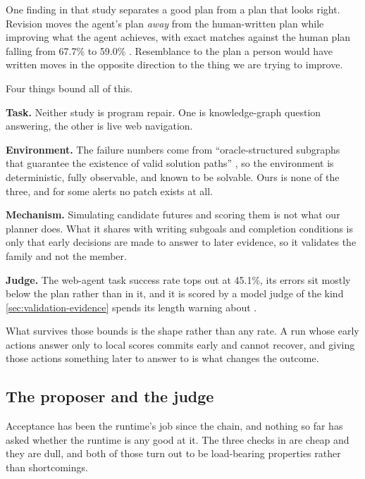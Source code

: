 One finding in that study separates a good plan from a plan that looks right. Revision moves the
agent's plan \emph{away} from the human-written plan while improving what the agent achieves, with
exact matches against the human plan falling from 67.7\% to 59.0\%
\citep[Table~2]{aghzal2026webagents}. Resemblance to the plan a person would have written moves in
the opposite direction to the thing we are trying to improve.

Four things bound all of this.

\bi

\item \textbf{Task.} Neither study is program repair. One is knowledge-graph question answering, the
other is live web navigation.

\item \textbf{Environment.} The failure numbers come from ``oracle-structured subgraphs that
guarantee the existence of valid solution paths'' \citep[\S5.1]{wang2026reasoningplan}, so the
environment is deterministic, fully observable, and known to be solvable. Ours is none of the three,
and for some alerts no patch exists at all.

\item \textbf{Mechanism.} Simulating candidate futures and scoring them is not what our planner
does. What it shares with writing subgoals and completion conditions is only that early decisions
are made to answer to later evidence, so it validates the family and not the member.

\item \textbf{Judge.} The web-agent task success rate tops out at 45.1\%, its errors sit mostly
below the plan rather than in it, and it is scored by a model judge of the kind
\cref{sec:validation-evidence} spends its length warning about
\citep[\S4.2, \S5.2]{aghzal2026webagents}.

\ei

What survives those bounds is the shape rather than any rate. A run whose early actions answer only
to local scores commits early and cannot recover, and giving those actions something later to answer
to is what changes the outcome.

\subsection{The proposer and the judge}
\label{sec:validation}
\label{sec:validation-actor}

Acceptance has been the runtime's job since the chain, and nothing so far has asked whether the
runtime is any good at it. The three checks in  are cheap and they are dull, and
both of those turn out to be load-bearing properties rather than shortcomings.

